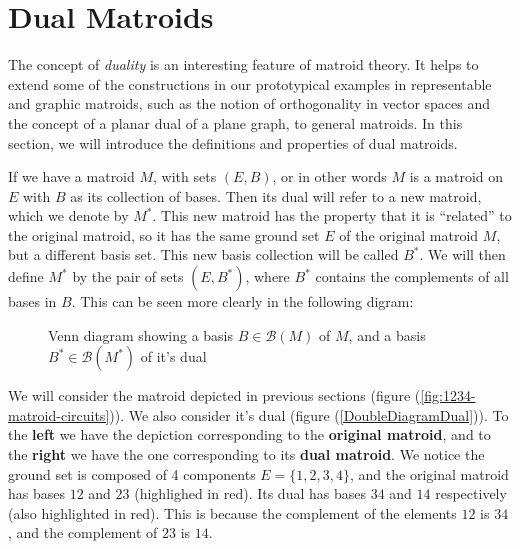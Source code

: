 \newpage
\section{Dual Matroids}
The concept of \textit{duality} is an interesting feature of matroid theory. It helps to extend some of the constructions in our prototypical examples in representable and graphic matroids, such as the notion of orthogonality in vector spaces and the concept of a planar dual of a plane graph, to general matroids. In this section, we will introduce the definitions and  properties of dual matroids.



If we have a matroid $M$, with sets $(E,B)$, or in other words $M$ is a matroid on $E$ with $B$ as its collection of bases. Then its dual will refer to a new matroid, which we denote by $M^*$. This new matroid has the property that it is ``related'' to the original matroid, so it has the same ground set $E$ of the original matroid $M$, but a different basis set. This new basis collection will be called $B^*$. We will then define $M^*$ by the pair of sets $(E,B^*)$, where $B^*$ contains the complements of all bases in $B$. This can be seen more clearly in the following digram:
\begin{figure}[H]
    \centering
{}
    \caption{Venn diagram showing a basis $B \in \mathcal B(M)$ of $M$, and a basis $B^* \in \mathcal B(M^*)$ of it's dual}%
\label{graphic}%
\end{figure}

We will consider the matroid depicted in previous sections (figure (\ref{fig:1234-matroid-circuits})). We also consider it's dual (figure (\ref{DoubleDiagramDual})). To the \textbf{left} we have the depiction corresponding to the \textbf{original matroid}, and to the \textbf{right} we have the one corresponding to its \textbf{dual matroid}. 
We notice the ground set is composed of 4 components $E=\{1,2,3,4\}$, and the original matroid has bases $12$ and $23$ (highlighed in red). Its dual has bases $34$ and $14$ respectively (also highlighted in red). This is because the complement of the elements $12$ is $34$, and the complement of $23$ is $14$.

